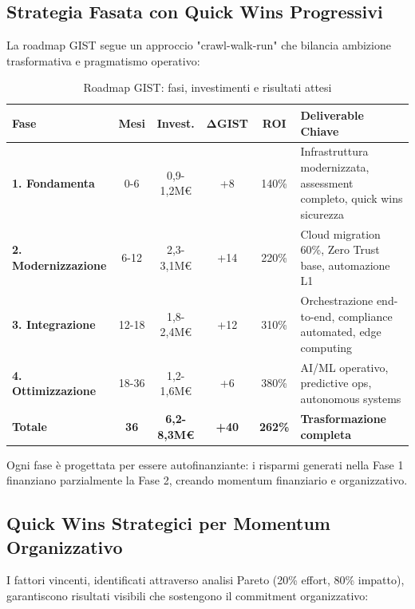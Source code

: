 \subsection{\texorpdfstring{Strategia Fasata con Quick Wins Progressivi}{5.4.1 - Strategia Fasata}}
\label{subsec:5.4.1}

La roadmap GIST segue un approccio "crawl-walk-run" che bilancia ambizione trasformativa e pragmatismo operativo:

\begin{table}[htbp]
\centering
\caption{Roadmap GIST: fasi, investimenti e risultati attesi}
\label{tab:roadmap_detailed}
\begin{tabular}{@{}p{2.5cm}ccccp{4cm}@{}}
\toprule
\textbf{Fase} & \textbf{Mesi} & \textbf{Invest.} & \textbf{ΔGIST} & \textbf{ROI} & \textbf{Deliverable Chiave} \\
\midrule
\rowcolor{blue!5}
\textbf{1. Fondamenta} & 0-6 & 0,9-1,2M€ & +8 & 140\% & Infrastruttura modernizzata, assessment completo, quick wins sicurezza \\
\rowcolor{green!5}
\textbf{2. Modernizzazione} & 6-12 & 2,3-3,1M€ & +14 & 220\% & Cloud migration 60\%, Zero Trust base, automazione L1 \\
\rowcolor{yellow!5}
\textbf{3. Integrazione} & 12-18 & 1,8-2,4M€ & +12 & 310\% & Orchestrazione end-to-end, compliance automated, edge computing \\
\rowcolor{orange!5}
\textbf{4. Ottimizzazione} & 18-36 & 1,2-1,6M€ & +6 & 380\% & AI/ML operativo, predictive ops, autonomous systems \\
\midrule
\textbf{Totale} & \textbf{36} & \textbf{6,2-8,3M€} & \textbf{+40} & \textbf{262\%} & \textbf{Trasformazione completa} \\
\bottomrule
\end{tabular}
\end{table}

Ogni fase è progettata per essere autofinanziante: i risparmi generati nella Fase 1 finanziano parzialmente la Fase 2, creando momentum finanziario e organizzativo.

\subsection{\texorpdfstring{Quick Wins Strategici per Momentum Organizzativo}{5.4.2 - Quick Wins}}
\label{subsec:5.4.2}

I fattori vincenti, identificati attraverso analisi Pareto (20\% effort, 80\% impatto), garantiscono risultati visibili che sostengono il commitment organizzativo:

